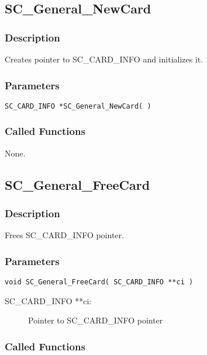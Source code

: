 \documentclass[a4paper,oneside]{article}
\begin{document}
\subsection{SC\_General\_NewCard}

\subsubsection*{Description}

Creates pointer to SC\_CARD\_INFO and initializes it.

\subsubsection*{Parameters}

\begin{verbatim}
SC_CARD_INFO *SC_General_NewCard( )
\end{verbatim}

\subsubsection*{Called Functions}

None.


\subsection{SC\_General\_FreeCard}

\subsubsection*{Description}

Frees SC\_CARD\_INFO pointer.

\subsubsection*{Parameters}

\begin{verbatim}
void SC_General_FreeCard( SC_CARD_INFO **ci )
\end{verbatim}

\begin{description}
\item[SC\_CARD\_INFO **ci:] Pointer to SC\_CARD\_INFO pointer
\end{description}

\subsubsection*{Called Functions}
\end{document}
